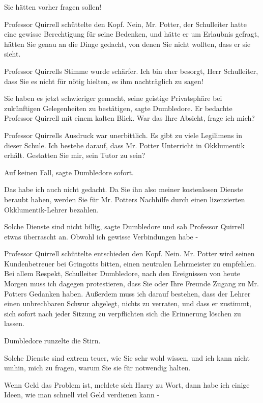 \glqq{}Sie hätten vorher fragen sollen!\grqq{}

Professor Quirrell schüttelte den Kopf. \glqq{}Nein, Mr. Potter, der Schulleiter
hatte eine gewisse Berechtigung für seine Bedenken, und hätte er um Erlaubnis
gefragt, hätten Sie genau an die Dinge gedacht, von denen Sie nicht wollten,
dass er sie sieht.\grqq{}

Professor Quirrells Stimme wurde schärfer. \glqq{}Ich bin eher besorgt, Herr
Schulleiter, dass Sie es nicht für nötig hielten, es ihm nachträglich zu
sagen!\grqq{}

\glqq{}Sie haben es jetzt schwieriger gemacht, seine geistige Privatsphäre bei
zukünftigen Gelegenheiten zu bestätigen\grqq{}, sagte Dumbledore. Er bedachte
Professor Quirrell mit einem kalten Blick. \glqq{}War das Ihre Absicht, frage ich
mich?\grqq{}

Professor Quirrells Ausdruck war unerbittlich. \glqq{}Es gibt zu viele Legilimens
in dieser Schule. Ich bestehe darauf, dass Mr. Potter Unterricht in Okklumentik
erhält. Gestatten Sie mir, sein Tutor zu sein?\grqq{}

\glqq{}Auf keinen Fall\grqq{}, sagte Dumbledore sofort.

\glqq{}Das habe ich auch nicht gedacht. Da Sie ihn also meiner kostenlosen
Dienste beraubt haben, werden Sie für Mr. Potters Nachhilfe durch einen
lizenzierten Okklumentik-Lehrer bezahlen.\grqq{}

\glqq{}Solche Dienste sind nicht billig\grqq{}, sagte Dumbledore und sah
Professor Quirrell etwas überrascht an. \glqq{}Obwohl ich gewisse Verbindungen
habe -\grqq{}

Professor Quirrell schüttelte entschieden den Kopf. \glqq{}Nein. Mr. Potter wird
seinen Kundenbetreuer bei Gringotts bitten, einen neutralen Lehrmeister zu
empfehlen. Bei allem Respekt, Schulleiter Dumbledore, nach den Ereignissen von
heute Morgen muss ich dagegen protestieren, dass Sie oder Ihre Freunde Zugang zu
Mr. Potters Gedanken haben. Außerdem muss ich darauf bestehen, dass der Lehrer
einen unbrechbaren Schwur abgelegt, nichts zu verraten, und dass er zustimmt,
sich sofort nach jeder Sitzung zu verpflichten sich die Erinnerung löschen zu
lassen.\grqq{}

Dumbledore runzelte die Stirn.

\glqq{}Solche Dienste sind extrem teuer, wie Sie sehr wohl wissen, und ich kann
nicht umhin, mich zu fragen, warum Sie sie für notwendig halten.\grqq{}

\glqq{}Wenn Geld das Problem ist\grqq{}, meldete sich Harry zu Wort, \glqq{}dann
habe ich einige Ideen, wie man schnell viel Geld verdienen kann -\grqq{}

